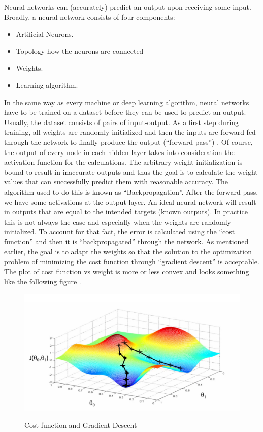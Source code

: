 \par Neural networks can (accurately) predict an output upon receiving some input. Broadly, a neural network consists of four components:
\begin{itemize}
    \item Artificial Neurons.
    \item Topology-how the neurons are connected
    \item Weights.
    \item Learning algorithm.
\end{itemize}
\par In the same way as every machine or deep learning algorithm, neural networks have to be trained on a dataset before they can be used to predict an output. Usually, the dataset consists of pairs of input-output. As a first step during training, all weights are randomly initialized and then the inputs are forward fed through the network to finally produce the output (“forward pass”) \cite{nicholson2019beginner}. Of course, the output of every node in each hidden layer takes into consideration the activation function for the calculations. The arbitrary weight initialization is bound to result in inaccurate outputs and thus the goal is to calculate the weight values that can successfully predict them with reasonable accuracy. The algorithm used to do this is known as “Backpropagation”. After the forward pass, we have some activations at the output layer.  An ideal neural network will result in outputs that are equal to the intended targets (known outputs). In practice this is not always the case and especially when the weights are randomly initialized. To account for that fact, the error is calculated using the “cost function” and then it is “backpropagated” through the network. As mentioned earlier, the goal is to adapt the weights so that the solution to the optimization problem of minimizing the cost function through “gradient descent” is acceptable. The plot of cost function vs weight is more or less convex and looks something like the following figure \cite{cost}.
\begin{figure}[h!]
\centering
\includegraphics[width=0.6\linewidth]{project/convex.PNG}
\label{fig:felix}
\caption{Cost function and Gradient Descent}
\end{figure}
